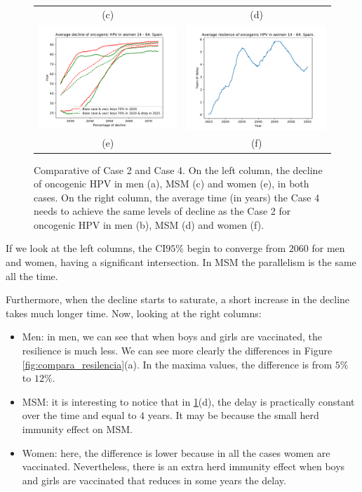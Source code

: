 \begin{figure}[!]
\begin{tabular}{cc}
		(c)	& (d) \\
		\includegraphics[width=0.5\linewidth]{IMGs/11.-Resilencia/2_y_4/decline_onco_muj.pdf}	& 
		\includegraphics[width=0.5\linewidth]{IMGs/11.-Resilencia/2_y_4/resilencia_onco_muj.pdf}  \\ 
		(e)	& (f) \\  
	\end{tabular} 
	\caption{Comparative of Case 2 and Case 4. On the left column, the decline of oncogenic HPV in men (a), MSM (c) and women (e), in both cases. On the right column, the average time (in years) the Case 4 needs to achieve the same levels of decline as the Case 2 for oncogenic HPV in men (b), MSM (d) and women (f).}
	\label{fig:Case2_Case4}
\end{figure}

If we look at the left columns, the CI$95\%$ begin to converge from $2060$ for men and women, having a significant intersection. In MSM the parallelism is the same all the time.

Furthermore, when the decline starts to saturate, a short increase in the decline takes much longer time. Now, looking at the right columns:

\begin{itemize}
\item Men: in men, we can see that when boys and girls are vaccinated, the resilience is much less. We can see more clearly the differences in Figure \ref{fig:compara_resilencia}(a). In the maxima values, the difference is from $5\%$ to $12\%$.
\item MSM: it is interesting to notice that in \ref{fig:Case2_Case4}(d), the delay is practically constant over the time and equal to $4$ years. It may be because the small herd immunity effect on MSM.
\item Women: here, the difference is lower because in all the cases women are vaccinated. Nevertheless, there is an extra herd immunity effect when boys and girls are vaccinated that reduces in some years the delay.
\end{itemize}

